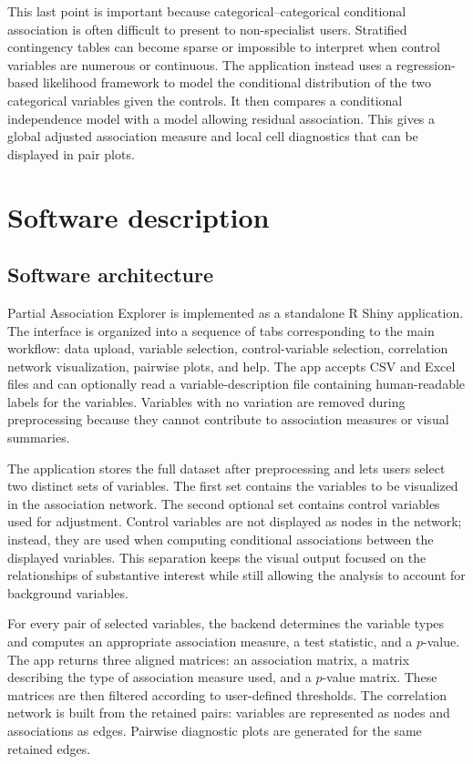 \documentclass[11pt,a4paper]{article}
\begin{document}
This last point is important because categorical--categorical conditional association is often difficult to present to non-specialist users. Stratified contingency tables can become sparse or impossible to interpret when control variables are numerous or continuous. The application instead uses a regression-based likelihood framework to model the conditional distribution of the two categorical variables given the controls. It then compares a conditional independence model with a model allowing residual association. This gives a global adjusted association measure and local cell diagnostics that can be displayed in pair plots.

\section{Software description}
\label{sec:software}

\subsection{Software architecture}

Partial Association Explorer is implemented as a standalone R Shiny application. The interface is organized into a sequence of tabs corresponding to the main workflow: data upload, variable selection, control-variable selection, correlation network visualization, pairwise plots, and help. The app accepts CSV and Excel files and can optionally read a variable-description file containing human-readable labels for the variables. Variables with no variation are removed during preprocessing because they cannot contribute to association measures or visual summaries.

The application stores the full dataset after preprocessing and lets users select two distinct sets of variables. The first set contains the variables to be visualized in the association network. The second optional set contains control variables used for adjustment. Control variables are not displayed as nodes in the network; instead, they are used when computing conditional associations between the displayed variables. This separation keeps the visual output focused on the relationships of substantive interest while still allowing the analysis to account for background variables.

For every pair of selected variables, the backend determines the variable types and computes an appropriate association measure, a test statistic, and a $p$-value. The app returns three aligned matrices: an association matrix, a matrix describing the type of association measure used, and a $p$-value matrix. These matrices are then filtered according to user-defined thresholds. The correlation network is built from the retained pairs: variables are represented as nodes and associations as edges. Pairwise diagnostic plots are generated for the same retained edges.
\end{document}

